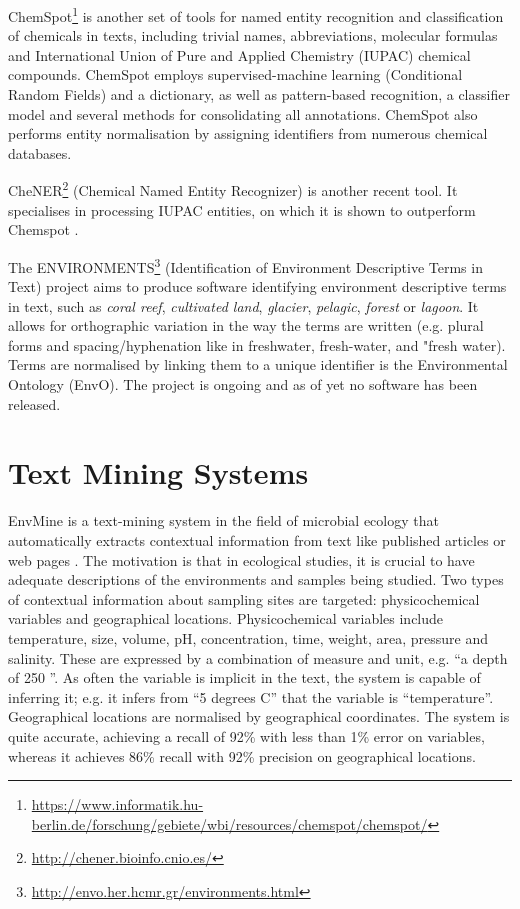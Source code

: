 ChemSpot\footnote{\url{https://www.informatik.hu-berlin.de/forschung/gebiete/wbi/resources/chemspot/chemspot/}} is another set of tools for named entity recognition and classification of chemicals in texts, including trivial names, abbreviations, molecular formulas and International Union of Pure and Applied Chemistry (IUPAC) chemical compounds. 
ChemSpot employs supervised-machine learning (Conditional Random Fields) and a dictionary, as well as pattern-based recognition, a classifier model and several methods for consolidating all annotations. 
ChemSpot also performs entity normalisation by assigning identifiers from numerous chemical databases. 

CheNER\footnote{\url{http://chener.bioinfo.cnio.es/}} (Chemical Named Entity Recognizer) is another recent tool. It specialises in processing IUPAC entities, on which it is shown to outperform Chemspot \citep{Usie2014CheNER}.

The ENVIRONMENTS\footnote{\url{http://envo.her.hcmr.gr/environments.html}} (Identification of Environment Descriptive Terms in Text) project aims to produce software identifying environment descriptive terms in text, such as \emph{coral reef}, \emph{cultivated land}, \emph{glacier}, \emph{pelagic}, \emph{forest} or \emph{lagoon}.
It allows for orthographic variation in the way the terms are written (e.g. plural forms and spacing/hyphenation like in freshwater, fresh-water, and "fresh water).
Terms are normalised by linking them to a unique identifier is the Environmental Ontology (EnvO).
The project is ongoing and as of yet no software has been released.

\section{Text Mining Systems}

EnvMine is a text-mining system in the field of microbial ecology that automatically extracts contextual information from text like published articles or web pages \cite{Tamames2010EnvMine}.
The motivation is that in ecological studies, it is crucial to have adequate descriptions of the environments and samples being studied. 
Two types of contextual information about sampling sites are targeted: physicochemical variables and geographical locations.
Physicochemical variables include temperature, size, volume, pH, concentration, time, weight, area, pressure and salinity.
These are expressed by a combination of measure and unit, e.g. ``a depth of 250 ''.
As often the variable is implicit in the text, the system is capable of inferring it; e.g. it infers from ``5 degrees C'' that the variable is ``temperature''.  
Geographical locations are normalised by geographical coordinates. 
The system is quite accurate, achieving a recall of 92\% with less than 1\% error on variables, whereas it achieves 86\% recall with 92\% precision on geographical locations.

